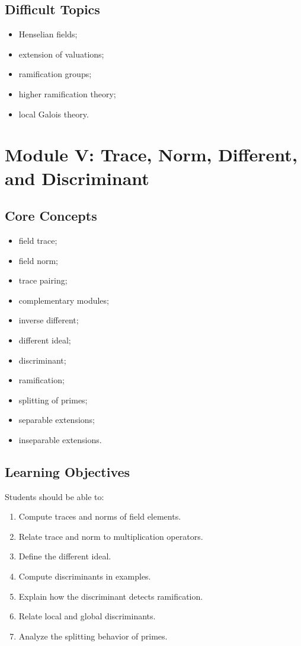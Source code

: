 \documentclass[11pt,a4paper]{article}
\begin{document}
\subsection{Difficult Topics}

\begin{itemize}
    \item Henselian fields;
    \item extension of valuations;
    \item ramification groups;
    \item higher ramification theory;
    \item local Galois theory.
\end{itemize}

\section{Module V: Trace, Norm, Different, and Discriminant}

\subsection{Core Concepts}

\begin{itemize}
    \item field trace;
    \item field norm;
    \item trace pairing;
    \item complementary modules;
    \item inverse different;
    \item different ideal;
    \item discriminant;
    \item ramification;
    \item splitting of primes;
    \item separable extensions;
    \item inseparable extensions.
\end{itemize}

\subsection{Learning Objectives}

Students should be able to:

\begin{enumerate}
    \item Compute traces and norms of field elements.
    \item Relate trace and norm to multiplication operators.
    \item Define the different ideal.
    \item Compute discriminants in examples.
    \item Explain how the discriminant detects ramification.
    \item Relate local and global discriminants.
    \item Analyze the splitting behavior of primes.
\end{enumerate}
\end{document}
